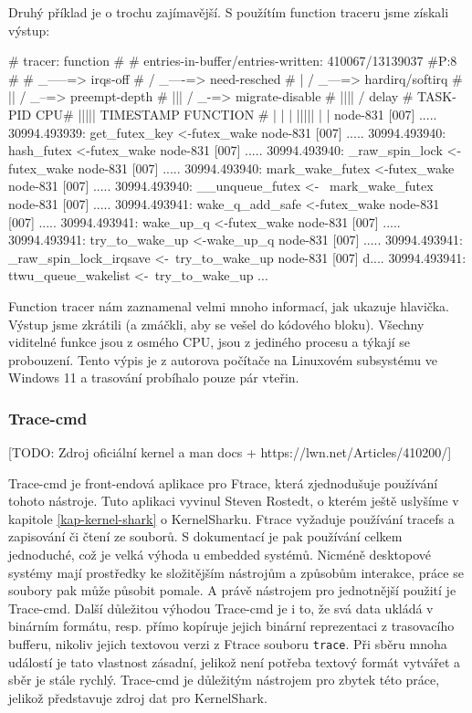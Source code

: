 Druhý příklad je o trochu zajímavější. S použítím function traceru jsme získali výstup:
\begin{code}
# tracer: function
#
# entries-in-buffer/entries-written: 410067/13139037   #P:8
#
#                      _-----=> irqs-off
#                     / _----=> need-resched
#                    | / _---=> hardirq/softirq
#                    || / _--=> preempt-depth
#                    ||| / _-=> migrate-disable
#                    |||| /     delay
# TASK-PID     CPU#  |||||  TIMESTAMP  FUNCTION
#    | |         |   |||||     |         |
  node-831     [007] ..... 30994.493939: get_futex_key <-futex_wake
  node-831     [007] ..... 30994.493940: hash_futex <-futex_wake
  node-831     [007] ..... 30994.493940: _raw_spin_lock <-futex_wake
  node-831     [007] ..... 30994.493940: mark_wake_futex <-futex_wake
  node-831     [007] ..... 30994.493940: __unqueue_futex <- \
                                         mark_wake_futex
  node-831     [007] ..... 30994.493941: wake_q_add_safe <-futex_wake
  node-831     [007] ..... 30994.493941: wake_up_q <-futex_wake
  node-831     [007] ..... 30994.493941: try_to_wake_up <-wake_up_q
  node-831     [007] ..... 30994.493941: _raw_spin_lock_irqsave <-\
                                         try_to_wake_up
  node-831     [007] d.... 30994.493941: ttwu_queue_wakelist <-\
                                         try_to_wake_up
...
\end{code}
Function tracer nám zaznamenal velmi mnoho informací, jak ukazuje hlavička. Výstup jsme zkrátili (a zmáčkli, aby se vešel do kódového bloku). Všechny viditelné funkce jsou z osmého CPU, jsou z jediného procesu a týkají se probouzení. Tento výpis je z autorova počítače na Linuxovém subsystému ve Windows 11 a trasování probíhalo pouze pár vteřin.

\subsubsection{Trace-cmd}

[TODO: Zdroj oficiální kernel a man docs + https://lwn.net/Articles/410200/]

Trace-cmd je front-endová aplikace pro Ftrace, která zjednodušuje používání tohoto nástroje. Tuto aplikaci vyvinul Steven Rostedt,  o kterém ještě uslyšíme v kapitole \ref{kap-kernel-shark} o KernelSharku. Ftrace vyžaduje používání tracefs a zapisování či čtení ze souborů. S dokumentací je pak používání celkem jednoduché, což je velká výhoda u embedded systémů. Nicméně desktopové systémy mají prostředky ke složitějším nástrojům a způsobům interakce, práce se soubory pak může působit pomale. A právě nástrojem pro jednotnější použití je Trace-cmd. Další důležitou výhodou Trace-cmd je i to, že svá data ukládá v binárním formátu, resp. přímo kopíruje jejich binární reprezentaci z trasovacího bufferu, nikoliv jejich textovou verzi z Ftrace souboru \texttt{trace}. Při sběru mnoha událostí je tato vlastnost zásadní, jelikož není potřeba textový formát vytvářet a sběr je stále rychlý. Trace-cmd je důležitým nástrojem pro zbytek této práce, jelikož představuje zdroj dat pro KernelShark.


